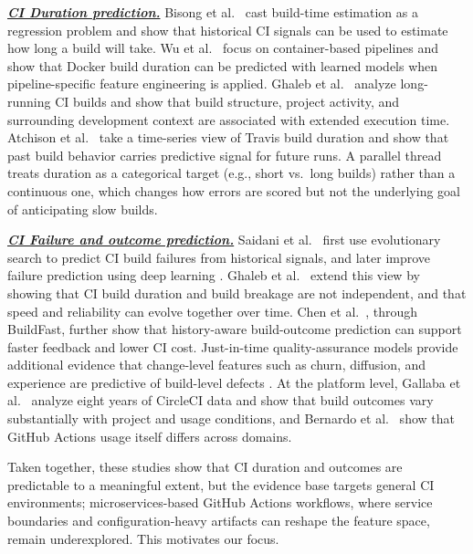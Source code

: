 \documentclass[conference]{IEEEconf}
\newcommand{\ali}[1]{\textcolor{red}{{\it [Ali: #1]}}}
\newcommand{\jasem}[1]{\textcolor{blue}{{\it [Jasem: #1]}}}
\begin{document}
\textbf{\textit{\underline{{CI Duration prediction.}}}} Bisong et al.\ \cite{Bisong2017BuildTimeModels} %
cast build-time estimation as a regression problem and show that historical CI signals can be used to estimate how long a build will take. Wu et al.\ \cite{Wu2022DockerBuildDuration} focus on container-based pipelines and show that Docker build duration can be predicted with learned models when pipeline-specific feature engineering is applied. Ghaleb et al.\ \cite{ghaleb2019longbuild} analyze long-running CI builds and show that build structure, project activity, and surrounding development context are associated with extended execution time. Atchison et al.\ \cite{Atchison2017TravisTimeSeries} take a time-series view of Travis build duration and show that past build behavior carries predictive signal for future runs. A parallel thread treats duration as a categorical target (e.g., short vs.\ long builds) rather than a continuous one, which changes how errors are scored but not the underlying goal of anticipating slow builds.

\textbf{\textit{\underline{{CI Failure and outcome prediction.}}}} Saidani et al.\ \cite{Saidani2020BuildFailureSearch} first use evolutionary search to predict CI build failures from historical signals, and later improve failure prediction using deep learning \cite{Saidani2022DLCIBuild}. Ghaleb et al.\ \cite{ghaleb2023interplay} extend this view by showing that CI build duration and build breakage are not independent, and that speed and reliability can evolve together over time. Chen et al.\ \cite{Chen2020BuildFast}, through BuildFast, further show that history-aware build-outcome prediction can support faster feedback and lower CI cost. Just-in-time quality-assurance models provide additional evidence that change-level features such as churn, diffusion, and experience are predictive of build-level defects \cite{Kamei2013JITQA}. At the platform level, Gallaba et al.\ \cite{Gallaba2022CircleCI} analyze eight years of CircleCI data and show that build outcomes vary substantially with project and usage conditions, and Bernardo et al.\ \cite{bernardo2024gha} show that GitHub Actions usage itself differs across domains.

Taken together, these studies show that CI duration and outcomes are predictable to a meaningful extent, but the evidence base targets general CI environments; microservices-based GitHub Actions workflows, where service boundaries and configuration-heavy artifacts can reshape the feature space, remain underexplored. This motivates our focus.
\end{document}
